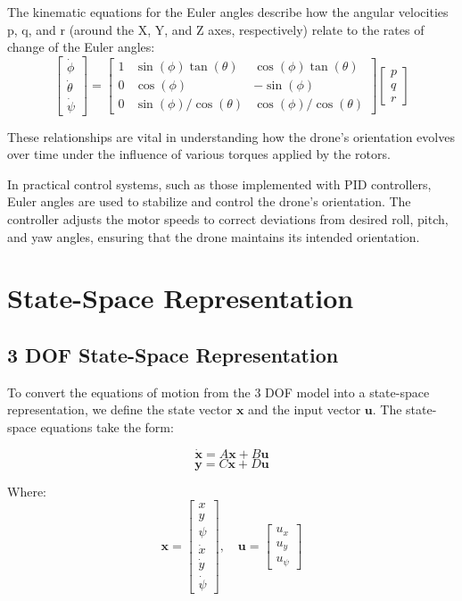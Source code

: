 \documentclass[a4paper,12pt]{report}
\begin{document}
The kinematic equations for the Euler angles describe how the angular velocities p, q, and r (around the X, Y, and Z axes, respectively) relate to the rates of change of the Euler angles:
\begin{equation}
    \begin{bmatrix}
    \dot{\phi} \\
    \dot{\theta} \\
    \dot{\psi}
    \end{bmatrix}
    =
    \begin{bmatrix}
    1 & \sin(\phi) \tan(\theta) & \cos(\phi) \tan(\theta) \\
    0 & \cos(\phi) & -\sin(\phi) \\
    0 & \sin(\phi)/\cos(\theta) & \cos(\phi)/\cos(\theta)
    \end{bmatrix}
    \begin{bmatrix}
    p \\
    q \\
    r
    \end{bmatrix}
\end{equation}
    
These relationships are vital in understanding how the drone's orientation evolves over time under the influence of various torques applied by the rotors.

In practical control systems, such as those implemented with PID controllers, Euler angles are used to stabilize and control the drone's orientation. 
The controller adjusts the motor speeds to correct deviations from desired roll, pitch, and yaw angles, ensuring that the drone maintains its intended orientation.
\chapter{State-Space Representation}

\section{3 DOF State-Space Representation}
To convert the equations of motion from the 3 DOF model into a state-space representation, we define the state vector \(\mathbf{x}\) and the input vector \(\mathbf{u}\). The state-space equations take the form:

\[
    \dot{\mathbf{x}} = A\mathbf{x} + B\mathbf{u}
\]
\[
    \mathbf{y} = C\mathbf{x} + D\mathbf{u}
\]

Where:
\[
    \mathbf{x} = \begin{bmatrix} x \\ y \\ \psi \\ \dot{x} \\ \dot{y} \\ \dot{\psi} \end{bmatrix}, \quad \mathbf{u} = \begin{bmatrix} u_x \\ u_y \\ u_\psi \end{bmatrix}
\]
\end{document}
